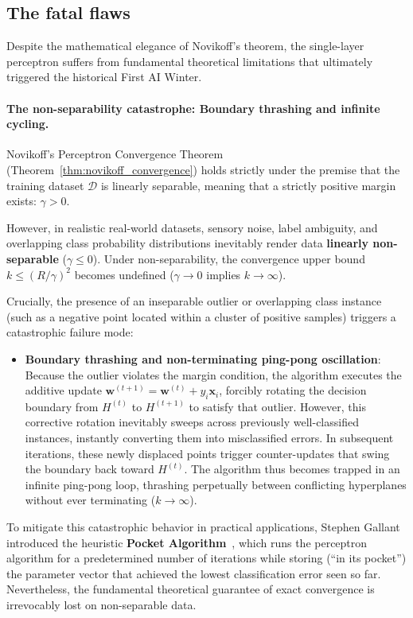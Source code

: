 \subsection{The fatal flaws}
\label{sec:xor_and_minsky_critique}

Despite the mathematical elegance of Novikoff's theorem, the single-layer perceptron suffers from fundamental theoretical limitations that ultimately triggered the historical First AI Winter.

\paragraph{The non-separability catastrophe: Boundary thrashing and infinite cycling.}
Novikoff's Perceptron Convergence Theorem (Theorem~\ref{thm:novikoff_convergence}) holds strictly under the premise that the training dataset $\mathcal{D}$ is linearly separable, meaning that a strictly positive margin exists: $\gamma > 0$.

However, in realistic real-world datasets, sensory noise, label ambiguity, and overlapping class probability distributions inevitably render data \textbf{linearly non-separable} ($\gamma \le 0$). Under non-separability, the convergence upper bound $k \le (R/\gamma)^2$ becomes undefined ($\gamma \to 0$ implies $k \to \infty$).

Crucially, the presence of an inseparable outlier or overlapping class instance (such as a negative point located within a cluster of positive samples) triggers a catastrophic failure mode:
\begin{itemize}[noitemsep,topsep=2pt,parsep=0pt,partopsep=0pt]
  \item \textbf{Boundary thrashing and non-terminating ping-pong oscillation}: Because the outlier violates the margin condition, the algorithm executes the additive update $\mathbf{w}^{(t+1)} = \mathbf{w}^{(t)} + y_i \mathbf{x}_i$, forcibly rotating the decision boundary from $H^{(t)}$ to $H^{(t+1)}$ to satisfy that outlier. However, this corrective rotation inevitably sweeps across previously well-classified instances, instantly converting them into misclassified errors. In subsequent iterations, these newly displaced points trigger counter-updates that swing the boundary back toward $H^{(t)}$. The algorithm thus becomes trapped in an infinite ping-pong loop, thrashing perpetually between conflicting hyperplanes without ever terminating ($k \to \infty$).
\end{itemize}

To mitigate this catastrophic behavior in practical applications, Stephen Gallant introduced the heuristic \textbf{Pocket Algorithm}~\cite{gallant1990perceptron}, which runs the perceptron algorithm for a predetermined number of iterations while storing (``in its pocket'') the parameter vector that achieved the lowest classification error seen so far. Nevertheless, the fundamental theoretical guarantee of exact convergence is irrevocably lost on non-separable data.


